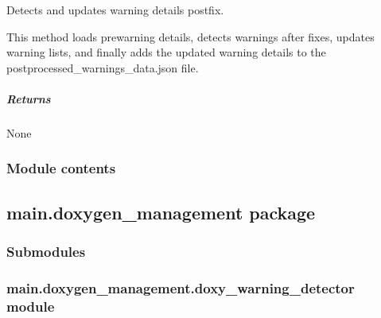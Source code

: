 \documentclass[letterpaper,10pt,english]{sphinxmanual}
\begin{document}
\begin{fulllineitems}
\begin{fulllineitems}
\label{\detokenize{main.doxy_warning_post_processor:main.doxy_warning_post_processor.doxy_warning_post_processor.WarningPostProcessor.detect_warning}}
\pysigstartsignatures
{}
\pysigstopsignatures
\sphinxAtStartPar
Detects and updates warning details post\sphinxhyphen{}fix.

\sphinxAtStartPar
This method loads pre\sphinxhyphen{}warning details, detects warnings after fixes, updates warning lists,
and finally adds the updated warning details to the postprocessed\_warnings\_data.json file.


\subparagraph{Returns}
\label{\detokenize{main.doxy_warning_post_processor:returns}}
\sphinxAtStartPar
None

\end{fulllineitems}


\end{fulllineitems}



\subsubsection{Module contents}
\label{\detokenize{main.doxy_warning_post_processor:module-main.doxy_warning_post_processor}}\label{\detokenize{main.doxy_warning_post_processor:module-contents}}
\sphinxstepscope


\subsection{main.doxygen\_management package}
\label{\detokenize{main.doxygen_management:main-doxygen-management-package}}\label{\detokenize{main.doxygen_management::doc}}

\subsubsection{Submodules}
\label{\detokenize{main.doxygen_management:submodules}}

\subsubsection{main.doxygen\_management.doxy\_warning\_detector module}
\label{\detokenize{main.doxygen_management:module-main.doxygen_management.doxy_warning_detector}}\label{\detokenize{main.doxygen_management:main-doxygen-management-doxy-warning-detector-module}}
\end{document}
